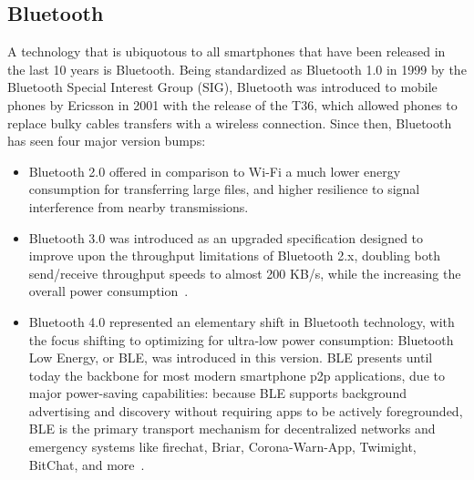 \subsection{Bluetooth}
A technology that is ubiquotous to all smartphones that have been released in the last 10 years is Bluetooth. Being standardized as Bluetooth 1.0 in 1999 by the Bluetooth Special Interest Group (SIG), Bluetooth was introduced to mobile phones by Ericsson in 2001 with the release of the T36, which allowed phones to replace bulky cables transfers with a wireless connection.
Since then, Bluetooth has seen four major version bumps:
\begin{itemize}
    \item Bluetooth 2.0 offered in comparison to Wi-Fi a much lower energy consumption for transferring large files, and higher resilience to signal interference from nearby transmissions.
    \item Bluetooth 3.0 was introduced as an upgraded specification designed to improve upon the throughput limitations of Bluetooth 2.x, doubling both send/receive throughput speeds to almost 200 KB/s, while the increasing the overall power consumption~\cite{Friedman2013}.
    \item Bluetooth 4.0 represented an elementary shift in Bluetooth technology, with the focus shifting to optimizing for ultra-low power consumption: Bluetooth Low Energy, or BLE, was introduced in this version. BLE presents until today the backbone for most modern smartphone p2p applications, due to major power-saving capabilities: because BLE supports background advertising and discovery without requiring apps to be actively foregrounded, BLE is the primary transport mechanism for decentralized networks and emergency systems like firechat, Briar, Corona-Warn-App, Twimight, BitChat, and more~\cite{firechat1,briar,CoronaWarnApp,bitchat}.
\end{itemize}

